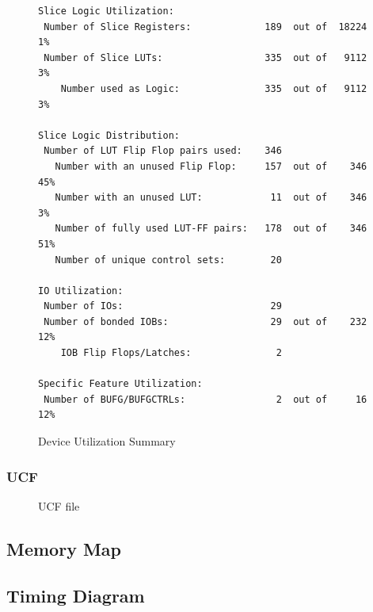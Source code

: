 \documentclass{article}
\begin{document}
	   		\begin{figure}[H]  
	   			\caption{Device Utilization Summary}
	   			\begin{lstlisting}
Slice Logic Utilization: 
 Number of Slice Registers:             189  out of  18224     1%  
 Number of Slice LUTs:                  335  out of   9112     3%  
    Number used as Logic:               335  out of   9112     3%  

Slice Logic Distribution: 
 Number of LUT Flip Flop pairs used:    346
   Number with an unused Flip Flop:     157  out of    346    45%  
   Number with an unused LUT:            11  out of    346     3%  
   Number of fully used LUT-FF pairs:   178  out of    346    51%  
   Number of unique control sets:        20

IO Utilization: 
 Number of IOs:                          29
 Number of bonded IOBs:                  29  out of    232    12%  
    IOB Flip Flops/Latches:               2

Specific Feature Utilization:
 Number of BUFG/BUFGCTRLs:                2  out of     16    12%  
	   			\end{lstlisting}
	   		\end{figure}

      \newpage
	   	\subsubsection{UCF}
        \begin{figure}[H]
          \caption{UCF file}
          
        \end{figure}

    \newpage
  	\subsection{Memory Map}



	\subsection{Timing Diagram}
\end{document}
